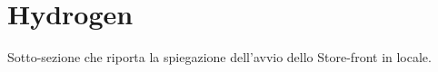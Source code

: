 \section{Hydrogen}

Sotto-sezione che riporta la spiegazione dell'avvio dello Store-front in locale.
